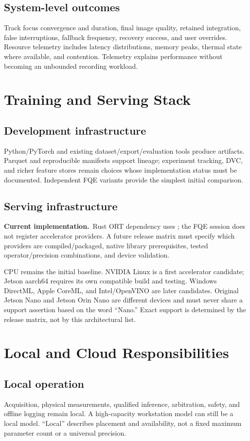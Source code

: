 \documentclass[11pt,a4paper]{article}
\newcommand{\code}[1]{\texttt{\detokenize{#1}}}
\newcommand{\current}{\textbf{Current implementation.}\ }
\begin{document}
\subsection{System-level outcomes}
Track focus convergence and duration, final image quality, retained integration,
false interruptions, fallback frequency, recovery success, and user overrides.
Resource telemetry includes latency distributions, memory peaks, thermal state
where available, and contention. Telemetry explains performance without
becoming an unbounded recording workload.

\section{Training and Serving Stack}
\subsection{Development infrastructure}
Python/PyTorch and existing dataset/export/evaluation tools produce artifacts.
Parquet and reproducible manifests support lineage; experiment tracking, DVC,
and richer feature stores remain choices whose implementation status must be
documented. Independent FQE variants provide the simplest initial comparison.

\subsection{Serving infrastructure}
\current Rust ORT dependency uses \code{download-binaries}; the FQE session
does not register accelerator providers. A future release matrix must specify
which providers are compiled/packaged, native library prerequisites, tested
operator/precision combinations, and device validation.

CPU remains the initial baseline. NVIDIA Linux is a first accelerator candidate;
Jetson aarch64 requires its own compatible build and testing. Windows DirectML,
Apple CoreML, and Intel/OpenVINO are later candidates. Original Jetson Nano and
Jetson Orin Nano are different devices and must never share a support assertion
based on the word ``Nano.'' Exact support is determined by the release matrix,
not by this architectural list.

\section{Local and Cloud Responsibilities}
\subsection{Local operation}
Acquisition, physical measurements, qualified inference, arbitration, safety,
and offline logging remain local. A high-capacity workstation model can still
be a local model. ``Local'' describes placement and availability, not a fixed
maximum parameter count or a universal precision.
\end{document}
